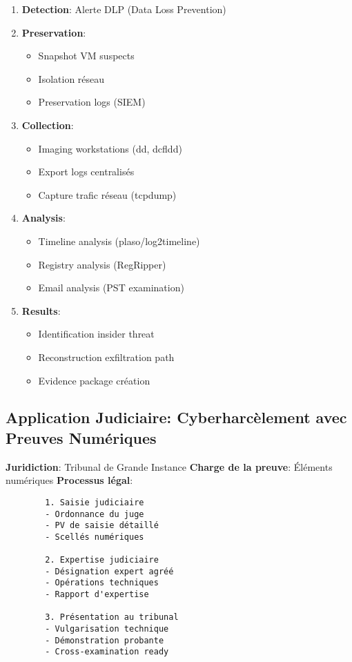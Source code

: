         \begin{enumerate}
            \item \textbf{Detection}: Alerte DLP (Data Loss Prevention)
            \item \textbf{Preservation}:
                \begin{itemize}
                    \item Snapshot VM suspects
                    \item Isolation réseau
                    \item Preservation logs (SIEM)
                \end{itemize}
            \item \textbf{Collection}:
                \begin{itemize}
                    \item Imaging workstations (dd, dcfldd)
                    \item Export logs centralisés
                    \item Capture trafic réseau (tcpdump)
                \end{itemize}
            \item \textbf{Analysis}:
                \begin{itemize}
                    \item Timeline analysis (plaso/log2timeline)
                    \item Registry analysis (RegRipper)
                    \item Email analysis (PST examination)
                \end{itemize}
            \item \textbf{Results}:
                \begin{itemize}
                    \item Identification insider threat
                    \item Reconstruction exfiltration path
                    \item Evidence package création
                \end{itemize}
        \end{enumerate}

    \subsection{Application Judiciaire: Cyberharcèlement avec Preuves Numériques}
        \textbf{Juridiction}: Tribunal de Grande Instance
        \textbf{Charge de la preuve}: Éléments numériques
        \textbf{Processus légal}:
        \begin{verbatim}
        1. Saisie judiciaire
        - Ordonnance du juge
        - PV de saisie détaillé
        - Scellés numériques

        2. Expertise judiciaire
        - Désignation expert agréé
        - Opérations techniques
        - Rapport d'expertise

        3. Présentation au tribunal
        - Vulgarisation technique
        - Démonstration probante
        - Cross-examination ready
        \end{verbatim}

